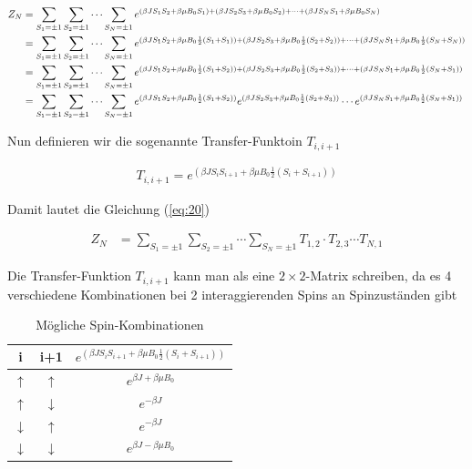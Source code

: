 \begin{align}
  \label{eq:20}
   Z_N &=\sum_{S_1=\pm 1}\sum_{S_2=\pm 1}\cdots \sum_{S_N=\pm 1} e^{(\beta J S_1 S_{2} + \beta \mu B_0 S_1) + (\beta J S_2 S_{3} + \beta \mu B_0 S_2) +\dots+ (\beta J S_N S_1 + \beta \mu B_0 S_N) } \notag\\
&=\sum_{S_1=\pm 1}\sum_{S_2=\pm 1}\cdots \sum_{S_N=\pm 1} e^{(\beta J S_1 S_{2} + \beta \mu B_0\frac{1}{2}(S_1+S_1)) + (\beta J S_2 S_{3} + \beta \mu B_0 \frac{1}{2}(S_2+S_2)) +\dots+ (\beta J S_N S_1 + \beta \mu B_0 \frac{1}{2}(S_N+S_N)) } \notag\\
&=\sum_{S_1=\pm 1}\sum_{S_2=\pm 1}\cdots \sum_{S_N=\pm 1} e^{(\beta J S_1 S_{2} + \beta \mu B_0\frac{1}{2}(S_1+S_2)) + (\beta J S_2 S_{3} + \beta \mu B_0 \frac{1}{2}(S_2+S_3)) +\dots+ (\beta J S_N S_1 + \beta \mu B_0 \frac{1}{2}(S_N+S_1)) } \notag\\
&=\sum_{S_1=\pm 1}\sum_{S_2=\pm 1}\cdots \sum_{S_N=\pm 1} e^{(\beta J S_1 S_{2} + \beta \mu B_0\frac{1}{2}(S_1+S_2))}e^{(\beta J S_2 S_{3} + \beta \mu B_0 \frac{1}{2}(S_2+S_3))}\cdots e^{(\beta J S_N S_1 + \beta \mu B_0 \frac{1}{2}(S_N+S_1)) } \notag\\
\end{align}

Nun definieren wir die sogenannte Transfer-Funktoin \(T_{i,i+1}\)

\begin{align}
  \label{eq:21}
  T_{i,i+1}= e^{(\beta J S_i S_{i+1} + \beta \mu B_0\frac{1}{2}(S_i+S_{i+1}))}
\end{align}

Damit lautet die Gleichung (\ref{eq:20})

\begin{align}
  \label{eq:22}
   Z_N &=\sum_{S_1=\pm 1}\sum_{S_2=\pm 1}\cdots \sum_{S_N=\pm 1} T_{1,2}\cdot T_{2,3}\cdots T_{N,1}
\end{align}

Die Transfer-Funktion \(T_{i,i+1}\) kann man als eine \(2\times 2\)-Matrix schreiben, da es 4 verschiedene Kombinationen bei 2 interaggierenden Spins an Spinzuständen gibt

\begin{table}[h]
  \centering
  \begin{tabular}{ccc}
    i&i+1&\( e^{(\beta J S_i S_{i+1} + \beta \mu B_0\frac{1}{2}(S_i+S_{i+1}))} \) \\
\hline
\hline
    \(\uparrow\)&\(\uparrow\)& \( e^{\beta J  + \beta \mu B_0 } \)  \\
\hline
    \(\uparrow\)&\(\downarrow\)& \( e^{-\beta J } \)   \\
\hline
    \(\downarrow\)&\(\uparrow\)& \( e^{-\beta J } \)  \\
\hline
    \(\downarrow\)&\(\downarrow\)& \( e^{\beta J  - \beta \mu B_0 } \)
  \end{tabular}
  \caption{Mögliche Spin-Kombinationen}
  \label{tab:1}
\end{table}

